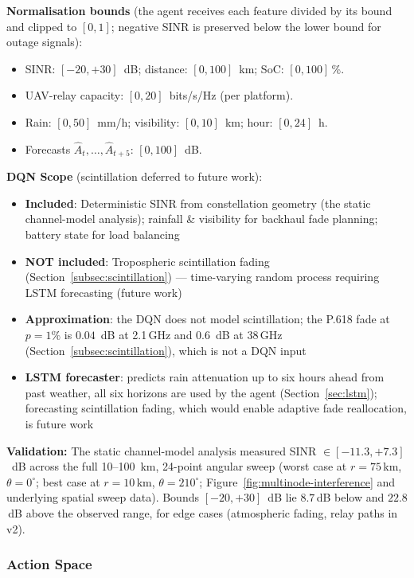 \documentclass[conference]{IEEEtran}
\begin{document}
\textbf{Normalisation bounds} (the agent receives each feature divided by its bound and clipped to $[0,1]$; negative SINR is preserved below the lower bound for outage signals):
\begin{itemize}\setlength{\itemsep}{0pt}
  \item SINR: $[-20,+30]$~dB; distance: $[0,100]$~km; SoC: $[0,100]$\,\%.
  \item UAV-relay capacity: $[0,20]$~bits/s/Hz (per platform).
  \item Rain: $[0,50]$~mm/h; visibility: $[0,10]$~km; hour: $[0,24]$~h.
  \item Forecasts $\hat{A}_{t},\dots,\hat{A}_{t+5}$: $[0,100]$~dB.
\end{itemize}

\noindent \textbf{DQN Scope} (scintillation deferred to future work):
\begin{itemize}\setlength{\itemsep}{0pt}
  \item \textbf{Included}: Deterministic SINR from constellation geometry (the static channel-model analysis); rainfall \& visibility for backhaul fade planning; battery state for load balancing
  \item \textbf{NOT included}: Tropospheric scintillation fading (Section~\ref{subsec:scintillation}) --- time-varying random process requiring LSTM forecasting (future work)
  \item \textbf{Approximation}: the DQN does not model scintillation; the P.618 fade at $p=1\%$ is $0.04$~dB at 2.1\,GHz and $0.6$~dB at 38\,GHz (Section~\ref{subsec:scintillation}), which is not a DQN input
  \item \textbf{LSTM forecaster}: predicts rain attenuation up to six hours ahead from past weather, all six horizons are used by the agent (Section~\ref{sec:lstm}); forecasting scintillation fading, which would enable adaptive fade reallocation, is future work
\end{itemize}

\textbf{Validation:} The static channel-model analysis measured SINR $\in [-11.3, +7.3]$~dB across the full 10--100~km, 24-point angular sweep (worst case at $r=75$\,km, $\theta=0^\circ$; best case at $r=10$\,km, $\theta=210^\circ$; Figure~\ref{fig:multinode-interference} and underlying spatial sweep data). Bounds $[-20, +30]$~dB lie $8.7$\,dB below and $22.8$\,dB above the observed range, for edge cases (atmospheric fading, relay paths in v2).

\subsubsection{Action Space}
\end{document}
